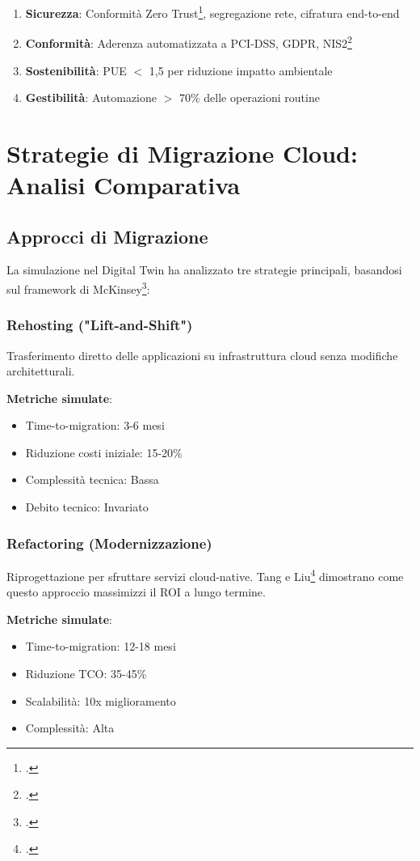 \begin{enumerate}
\item \textbf{Sicurezza}: Conformità Zero Trust\footcite{enisa2024retail}, segregazione rete, cifratura end-to-end
\item \textbf{Conformità}: Aderenza automatizzata a PCI-DSS, GDPR, NIS2\footcite{PricewaterhouseCoopers2024}
\item \textbf{Sostenibilità}: PUE $<$ 1,5 per riduzione impatto ambientale
\item \textbf{Gestibilità}: Automazione $>$ 70\% delle operazioni routine
\end{enumerate}

\section{Strategie di Migrazione Cloud: Analisi Comparativa}

\subsection{Approcci di Migrazione}

La simulazione nel Digital Twin ha analizzato tre strategie principali, basandosi sul framework di McKinsey\footcite{mckinsey2024}:

\subsubsection{Rehosting ("Lift-and-Shift")}
Trasferimento diretto delle applicazioni su infrastruttura cloud senza modifiche architetturali.

\textbf{Metriche simulate}:
\begin{itemize}
\item Time-to-migration: 3-6 mesi
\item Riduzione costi iniziale: 15-20\%
\item Complessità tecnica: Bassa
\item Debito tecnico: Invariato
\end{itemize}

\subsubsection{Refactoring (Modernizzazione)}
Riprogettazione per sfruttare servizi cloud-native. Tang e Liu\footcite{Tang2024portfolio} dimostrano come questo approccio massimizzi il ROI a lungo termine.

\textbf{Metriche simulate}:
\begin{itemize}
\item Time-to-migration: 12-18 mesi
\item Riduzione TCO: 35-45\%
\item Scalabilità: 10x miglioramento
\item Complessità: Alta
\end{itemize}

